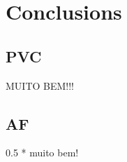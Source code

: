 \documentclass[a4paper,titlepage]{article}
\begin{document}
\begin{table}[htbp]
\begin{tabular}{c |rr|rr|rr|}
    \end{tabular}%
  \label{tab:addlabel}%
\end{table}%



\section{Conclusions}

\subsection{PVC}
MUITO BEM!!!

\subsection{AF}
0.5 * muito bem!
\end{document}

